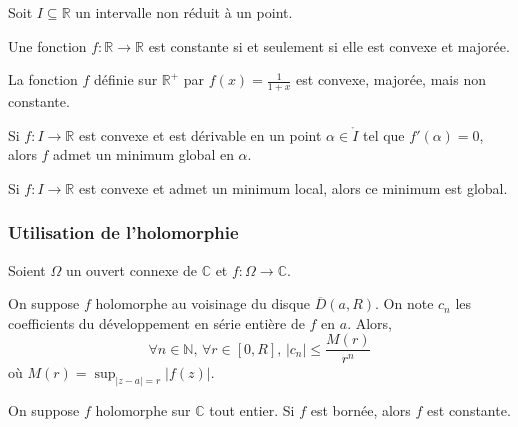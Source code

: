 
  Soit $I \subseteq \mathbb{R}$ un intervalle non réduit à un point.

  \begin{proposition}
    Une fonction $f : \mathbb{R} \rightarrow \mathbb{R}$ est constante si et seulement si elle est convexe et majorée.
  \end{proposition}

  \begin{cexample}
    La fonction $f$ définie sur $\mathbb{R}^+$ par $f(x) = \frac{1}{1+x}$ est convexe, majorée, mais non constante.
  \end{cexample}

  \begin{proposition}
    Si $f : I \rightarrow \mathbb{R}$ est convexe et est dérivable en un point $\alpha \in \mathring{I}$ tel que $f'(\alpha) = 0$, alors $f$ admet un minimum global en $\alpha$.
  \end{proposition}

  \begin{proposition}
    Si $f : I \rightarrow \mathbb{R}$ est convexe et admet un minimum local, alors ce minimum est global.
  \end{proposition}

  \subsubsection{Utilisation de l'holomorphie}


  Soient $\Omega$ un ouvert connexe de $\mathbb{C}$ et $f : \Omega \rightarrow \mathbb{C}$.

  \begin{proposition}
    On suppose $f$ holomorphe au voisinage du disque $\overline{D}(a,R)$. On note $c_n$ les coefficients du développement en série entière de $f$ en $a$. Alors,
    \[ \forall n \in \mathbb{N}, \, \forall r \in [0,R], \, \vert c_n \vert \leq \frac{M(r)}{r^n} \]
    où $M(r) = \sup_{\vert z-a \vert = r} \vert f(z) \vert$.
  \end{proposition}

  \begin{corollary}
    On suppose $f$ holomorphe sur $\mathbb{C}$ tout entier. Si $f$ est bornée, alors $f$ est constante.
  \end{corollary}


